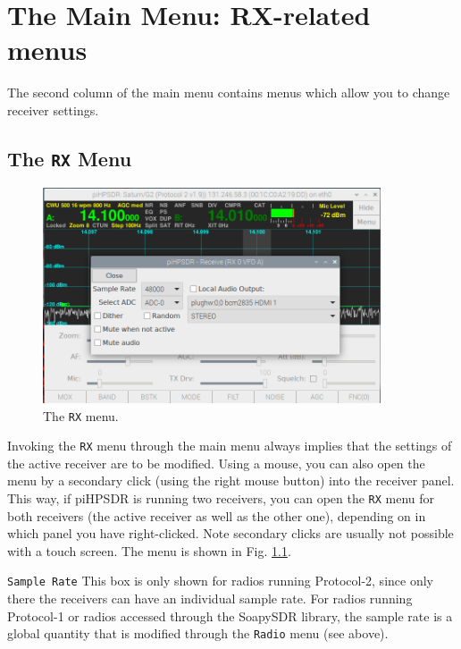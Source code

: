 \documentclass[12pt]{book}
\def\rett#1{\texttt{\color{red}#1}}
\def\bltt#1{\texttt{\color{blue}#1}}
\def\pH{pi\-HPSDR\xspace}
\begin{document}
\chapter[RX-related menus]{The Main Menu: RX-related menus}

The second column of the main menu contains menus which allow you to change
receiver settings.

\section{The \texttt{RX} Menu}

\begin{figure}[ht!]
\center
\includegraphics[width=10cm]{RXMenu.png}
\caption{The \bltt{RX} menu.}
\label{fig:RXMenu}
\end{figure}

Invoking the \bltt{RX} menu through the main menu always implies that the settings
of the active receiver are to be modified. Using a mouse, you can also open the menu
by a secondary click (using the right mouse button) into the receiver panel. This way,
if \pH is running two receivers, you can open the \bltt{RX} menu for both receivers
(the active receiver as well as the other one), depending on in which panel you have
right-clicked. Note secondary clicks are usually not possible with a touch screen.
The menu is shown in Fig. \ref{fig:RXMenu}.

\rett{Sample Rate} This box is only shown for radios running Protocol-2, since only there the
receivers can have an individual sample rate. For radios running Protocol-1 or radios accessed
through the SoapySDR library, the sample rate is a global quantity that is modified
through the \bltt{Radio} menu (see above).
\end{document}
